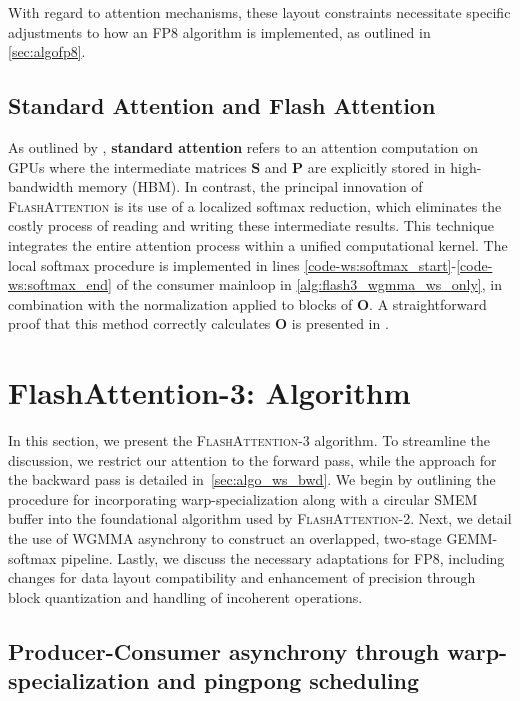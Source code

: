 \begin{enumerate}
With regard to attention mechanisms, these layout constraints necessitate specific adjustments to how an FP8 algorithm is implemented, as outlined in \cref{sec:algofp8}.

\subsection{Standard Attention and Flash Attention} As outlined by \citet{dao2022flashattention}, \textbf{standard attention} refers to an attention computation on GPUs where the intermediate matrices $\mathbf{S}$ and $\mathbf{P}$ are explicitly stored in high-bandwidth memory (HBM). In contrast, the principal innovation of \textsc{FlashAttention} is its use of a localized softmax reduction, which eliminates the costly process of reading and writing these intermediate results. This technique integrates the entire attention process within a unified computational kernel. The local softmax procedure is implemented in lines \ref{code-ws:softmax_start}-\ref{code-ws:softmax_end} of the consumer mainloop in \cref{alg:flash3_wgmma_ws_only}, in combination with the normalization applied to blocks of $\mathbf{O}$. A straightforward proof that this method correctly calculates $\mathbf{O}$ is presented in \cite[\S 2.3.1]{dao2023flashattention2}.

\section{FlashAttention-3: Algorithm}
\label{sec:algo}

In this section, we present the \textsc{FlashAttention-3} algorithm. To streamline the discussion, we restrict our attention to the forward pass, while the approach for the backward pass is detailed in~\cref{sec:algo_ws_bwd}. We begin by outlining the procedure for incorporating warp-specialization along with a circular SMEM buffer into the foundational algorithm used by \textsc{FlashAttention-2}. Next, we detail the use of WGMMA asynchrony to construct an overlapped, two-stage GEMM-softmax pipeline. Lastly, we discuss the necessary adaptations for FP8, including changes for data layout compatibility and enhancement of precision through block quantization and handling of incoherent operations.

\subsection{Producer-Consumer asynchrony through warp-specialization and pingpong scheduling}
\label{sec:algo_ws}


\end{enumerate}

